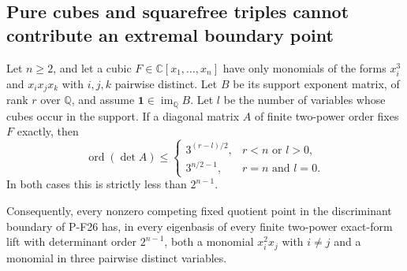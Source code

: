\subsection{Pure cubes and squarefree triples cannot contribute an extremal boundary point}

\begin{proposition}
\label{prop:cubicsquarefreesupport}
Let $n\ge2$, and let a cubic $F\in\mathbb C[x_1,\ldots,x_n]$
have only monomials of the forms $x_i^3$ and $x_ix_jx_k$
with $i,j,k$ pairwise distinct. Let $B$ be its support
exponent matrix, of rank $r$ over $\mathbb Q$, and assume
$\mathbf1\in\operatorname{im}_{\mathbb Q}B$. Let $l$ be the
number of variables whose cubes occur in the support.
If a diagonal matrix $A$ of finite two-power order fixes
$F$ exactly, then
\[
 \operatorname{ord}(\det A)\le
 \begin{cases}
  3^{(r-l)/2},&r<n\text{ or }l>0,\\
  3^{n/2-1},&r=n\text{ and }l=0.
 \end{cases}
 \tag{P-F29a}
\]
In both cases this is strictly less than $2^{n-1}$.

Consequently, every nonzero competing fixed quotient point
in the discriminant boundary of P-F26 has, in every
eigenbasis of every finite two-power exact-form lift with
determinant order $2^{n-1}$, both a monomial $x_i^2x_j$
with $i\ne j$ and a monomial in three pairwise distinct
variables.
\end{proposition}


